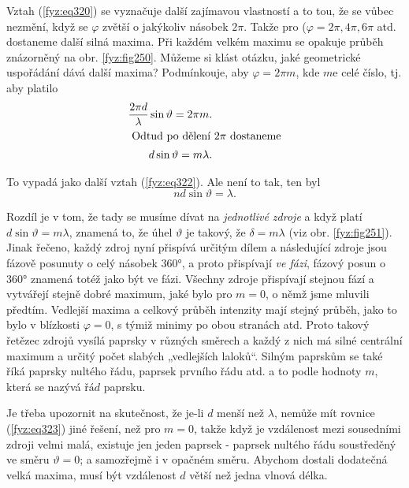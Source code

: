     Vztah (\ref{fyz:eq320}) se vyznačuje další zajímavou vlastností a to tou, že se vůbec nezmění, 
    když se \(\varphi\) zvětší o jakýkoliv násobek \(2\pi\). Takže pro (\(\varphi = 2\pi, 4\pi, 
    6\pi\) atd. dostaneme další silná maxima. Při každém velkém maximu se opakuje průběh znázorněný 
    na obr. \ref{fyz:fig250}. Můžeme si klást otázku, jaké geometrické uspořádání dává další 
    maxima? Podmínkouje, aby \(\varphi=2\pi m\), kde \(m\)e celé číslo, tj. aby platilo
    \begin{align}
      \frac{2\pi d}{\lambda}\sin\vartheta = 2\pi m.         \nonumber \\
      \shortintertext{ Odtud po dělení \(2\pi\) dostaneme}  
      d\sin\vartheta = m\lambda.                            \label{fyz:eq323}
    \end{align}

    To vypadá jako další vztah (\ref{fyz:eq322}). Ale není to tak, ten byl 
    \begin{equation*}
      nd\sin\vartheta = \lambda.
    \end{equation*}
    
    Rozdíl je v tom, že tady se musíme dívat na \emph{jednotlivé zdroje} a když platí 
    \(d\sin\vartheta = m\lambda\), znamená to, že úhel \(\vartheta\) je takový, že \(\delta= 
    m\lambda\) (viz obr. \ref{fyz:fig251}). Jinak řečeno, každý zdroj nyní přispívá určitým dílem a 
    následující zdroje jsou fázově posunuty o celý násobek \ang{360}, a proto přispívají 
    \emph{ve fázi}, fázový posun o \ang{360} znamená totéž jako být ve fázi. Všechny zdroje 
    přispívají stejnou fází a vytvářejí stejně dobré maximum, jaké bylo pro \(m = 0\), o němž jsme 
    mluvili předtím. Vedlejší maxima a celkový průběh intenzity mají stejný průběh, jako to bylo v 
    blízkosti \(\varphi = 0\), s týmiž minimy po obou stranách atd. Proto takový řetězec zdrojů 
    vysílá paprsky v různých směrech a každý z nich má silné centrální maximum a určitý počet 
    slabých „vedlejších laloků“. Silným paprskům se také říká paprsky nultého řádu, paprsek prvního 
    řádu atd. a to podle hodnoty \(m\), která se nazývá \(řád\) paprsku.
    
    Je třeba upozornit na skutečnost, že je-li \(d\) menší než \(\lambda\), nemůže mít rovnice 
    (\ref{fyz:eq323}) jiné řešení, než pro \(m = 0\), takže když je vzdálenost mezi sousedními 
    zdroji velmi malá, existuje jen jeden paprsek - paprsek nultého řádu soustředěný ve směru 
    \(\vartheta = 0\); a samozřejmě i v opačném směru. Abychom dostali dodatečná velká maxima, musí 
    být vzdálenost \(d\) větší než jedna vlnová délka.
    

